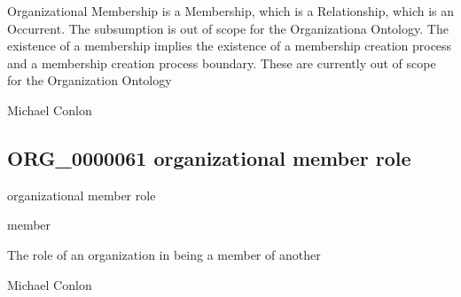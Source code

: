 \documentclass[letterpaper,10pt,english]{sphinxmanual}
\begin{document}
\begin{sphinxShadowBox}

\sphinxAtStartPar
Organizational Membership is a Membership, which is a Relationship, which is an Occurrent.  The subsumption is out of scope for the Organizationa Ontology. The existence of a membership implies the existence of a membership creation process and a membership creation process boundary.  These are currently out of scope for the Organization Ontology
\end{sphinxShadowBox}

\begin{sphinxShadowBox}

\sphinxAtStartPar
Michael Conlon 
\end{sphinxShadowBox}
\begin{quote}

\ignorespaces \end{quote}


\subsection{ORG\_0000061 \sphinxhyphen{} organizational member role}
\label{\detokenize{doc-ORG_0000061:org-0000061-organizational-member-role}}\label{\detokenize{doc-ORG_0000061:index-0}}\label{\detokenize{doc-ORG_0000061::doc}}
\begin{sphinxShadowBox}

\sphinxAtStartPar
organizational member role
\end{sphinxShadowBox}

\begin{sphinxShadowBox}

\sphinxAtStartPar
member
\end{sphinxShadowBox}

\begin{sphinxShadowBox}

\sphinxAtStartPar
The role of an organization in being a member of another
\end{sphinxShadowBox}

\begin{sphinxShadowBox}

\sphinxAtStartPar
Michael Conlon 
\end{sphinxShadowBox}
\end{document}
